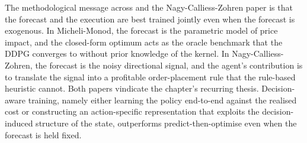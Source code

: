 The methodological message across \citet{MicheliMonod2024} and the
Nagy-Calliess-Zohren paper is that the forecast and the execution are best
trained jointly even when the forecast is exogenous. In Micheli-Monod, the
forecast is the parametric model of price impact, and the closed-form
optimum acts as the oracle benchmark that the DDPG converges to without
prior knowledge of the kernel. In Nagy-Calliess-Zohren, the forecast is the
noisy directional signal, and the agent's contribution is to translate the
signal into a profitable order-placement rule that the rule-based heuristic
cannot. Both papers vindicate the chapter's recurring thesis. Decision-aware
training, namely either learning the policy end-to-end against the realised
cost or constructing an action-specific representation that exploits the
decision-induced structure of the state, outperforms predict-then-optimise
even when the forecast is held fixed.
